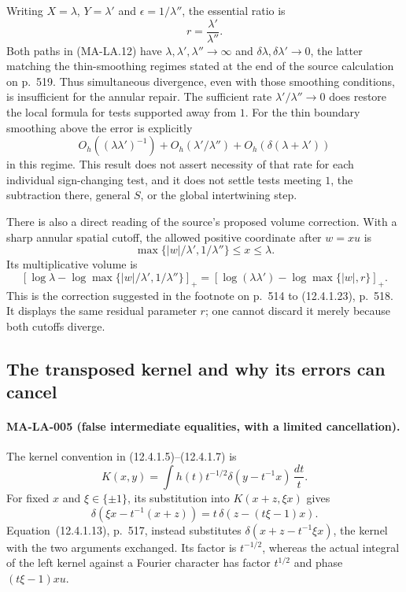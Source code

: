 Writing $X=\lambda$, $Y=\lambda'$ and
$\epsilon=1/\lambda''$, the essential ratio is
\[
 r=\frac{\lambda'}{\lambda''}.
 \tag{MA-LA.13}
\]
Both paths in (MA-LA.12) have
$\lambda,\lambda',\lambda''\to\infty$ and
$\delta\lambda,\delta\lambda'\to0$, the latter matching the
thin-smoothing regimes stated at the end of the source calculation
on p.~519.  Thus simultaneous divergence, even with those
smoothing conditions, is insufficient for the annular repair.
The sufficient rate $\lambda'/\lambda''\to0$ does restore the
local formula for tests supported away from $1$.  For the thin
boundary smoothing above the error is explicitly
\[
 O_h((\lambda\lambda')^{-1})+
 O_h(\lambda'/\lambda'')+
 O_h(\delta(\lambda+\lambda'))
 \tag{MA-LA.14}
\]
in this regime.  This result does not assert necessity of that rate
for each individual sign-changing test, and it does not settle
tests meeting $1$, the subtraction there, general $S$, or the
global intertwining step.

There is also a direct reading of the source's proposed volume
correction.  With a sharp annular spatial cutoff, the allowed
positive coordinate after $w=xu$ is
\[
 \max\{|w|/\lambda',1/\lambda''\}\le x\le\lambda.
\]
Its multiplicative volume is
\[
 \left[\log\lambda-
   \log\max\{|w|/\lambda',1/\lambda''\}\right]_+
 =\left[\log(\lambda\lambda')-
   \log\max\{|w|,r\}\right]_+.
\]
This is the correction suggested in the footnote on p.~514 to
(12.4.1.23), p.~518.  It displays the same residual parameter $r$;
one cannot discard it merely because both cutoffs diverge.

\subsection{The transposed kernel and why its errors can cancel}

\paragraph{MA-LA-005 (false intermediate equalities, with a limited
cancellation).}
The kernel convention in (12.4.1.5)--(12.4.1.7) is
\[
 K(x,y)=\int h(t)t^{-1/2}\delta(y-t^{-1}x)\,\frac{dt}{t}.
 \tag{MA-LA.15}
\]
For fixed $x$ and $\xi\in\{\pm1\}$, its substitution into
$K(x+z,\xi x)$ gives
\[
 \delta(\xi x-t^{-1}(x+z))
   =t\,\delta(z-(t\xi-1)x).
 \tag{MA-LA.16}
\]
Equation~(12.4.1.13), p.~517, instead substitutes
$\delta(x+z-t^{-1}\xi x)$, the kernel with the two arguments
exchanged.  Its factor is $t^{-1/2}$, whereas the actual integral
of the left kernel against a Fourier character has factor
$t^{1/2}$ and phase $(t\xi-1)xu$.

